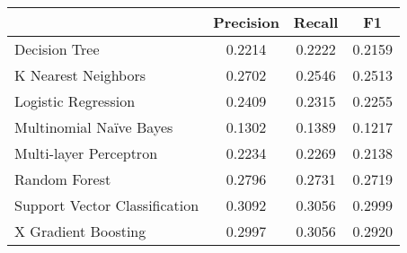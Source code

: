 \documentclass[12pt]{diazessay}
\begin{document}
\begin{table}[!htbp] \centering 
	\caption{ Evaluation metrics ``Tier List'' \texttt{[1, 5]}}
	\label{tab:tier20}
\begin{longtable}[]{@{}lccc@{}}
	\toprule
	& Precision & Recall & F1 \\
	\midrule
	\endhead
	Decision Tree & 0.2214 & 0.2222 & 0.2159 \\
	K Nearest Neighbors & 0.2702 & 0.2546 & 0.2513 \\
	Logistic Regression & 0.2409 & 0.2315 & 0.2255 \\
	Multinomial Naïve Bayes & 0.1302 & 0.1389 & 0.1217 \\
	Multi-layer Perceptron & 0.2234 & 0.2269 & 0.2138 \\
	Random Forest & 0.2796 & 0.2731 & 0.2719 \\
	Support Vector Classification & 0.3092 & 0.3056 & 0.2999 \\
	X Gradient Boosting & 0.2997 & 0.3056 & 0.2920 \\
	\bottomrule
\end{longtable}
\end{table}
\end{document}
